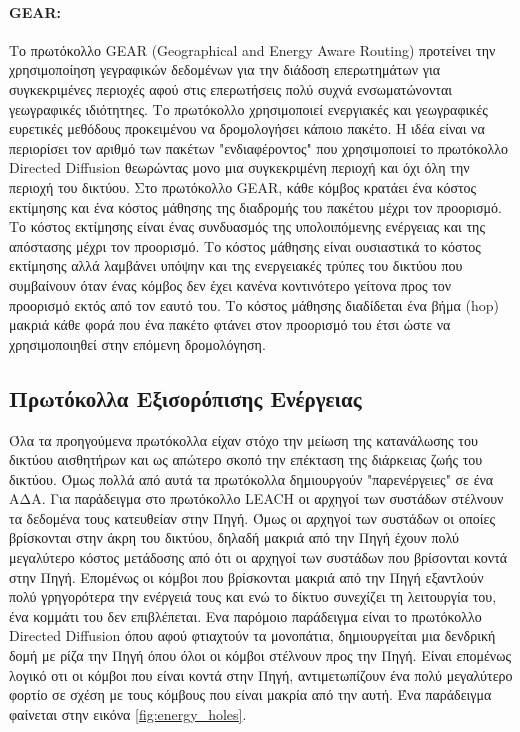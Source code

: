 \paragraph{GEAR:} Το πρωτόκολλο GEAR (Geographical and Energy Aware Routing) \cite{gear_protocol} προτείνει την χρησιμοποίηση γεγραφικών δεδομένων για την διάδοση
επερωτημάτων για συγκεκριμένες περιοχές αφού στις επερωτήσεις πολύ συχνά ενσωματώνονται γεωγραφικές ιδιότητηες. Το πρωτόκολλο χρησιμοποιεί ενεργιακές και γεωγραφικές
ευρετικές μεθόδους προκειμένου να δρομολογήσει κάποιο πακέτο. Η ιδέα είναι να περιορίσει τον αριθμό των πακέτων "ενδιαφέροντος" που χρησιμοποιεί το πρωτόκολλο
Directed Diffusion \cite{directed_diffusion} θεωρώντας μονο μια συγκεκριμένη περιοχή και όχι όλη την περιοχή του δικτύου. Στο πρωτόκολλο GEAR, κάθε κόμβος κρατάει
ένα κόστος εκτίμησης και ένα κόστος μάθησης της διαδρομής του πακέτου μέχρι τον προορισμό. Το κόστος εκτίμησης είναι ένας συνδυασμός της υπολοιπόμενης ενέργειας και
της απόστασης μέχρι τον προορισμό. Το κόστος μάθησης είναι ουσιαστικά το κόστος εκτίμησης αλλά λαμβάνει υπόψην και της ενεργειακές τρύπες του δικτύου που συμβαίνουν
όταν ένας κόμβος δεν έχει κανένα κοντινότερο γείτονα προς τον προορισμό εκτός από τον εαυτό του. Το κόστος μάθησης διαδίδεται ένα βήμα (hop) μακριά κάθε φορά που ένα
πακέτο φτάνει στον προορισμό του έτσι ώστε να χρησιμοποιηθεί στην επόμενη δρομολόγηση.




\subsection{Πρωτόκολλα Εξισορόπισης Ενέργειας}
Όλα τα προηγούμενα πρωτόκολλα είχαν στόχο την μείωση της κατανάλωσης του δικτύου αισθητήρων και ως απώτερο σκοπό την επέκταση της διάρκειας ζωής του δικτύου.
Όμως πολλά από αυτά τα πρωτόκολλα δημιουργούν "παρενέργειες" σε ένα ΑΔΑ.
Για παράδειγμα στο πρωτόκολλο LEACH \cite{leach_protocol} οι αρχηγοί των συστάδων στέλνουν τα δεδομένα τους κατευθείαν στην Πηγή. Όμως οι αρχηγοί των συστάδων οι
οποίες βρίσκονται στην άκρη του δικτύου, δηλαδή μακριά από την Πηγή έχουν πολύ μεγαλύτερο κόστος μετάδοσης από ότι οι αρχηγοί των συστάδων που βρίσονται κοντά στην
Πηγή.
Επομένως οι κόμβοι που βρίσκονται μακριά από την Πηγή εξαντλούν πολύ γρηγορότερα την ενέργειά τους και ενώ το δίκτυο συνεχίζει τη λειτουργία του, ένα κομμάτι
του δεν επιβλέπεται.
Ενα παρόμοιο παράδειγμα είναι το πρωτόκολλο Directed Diffusion \cite{directed_diffusion} όπου αφού φτιαχτούν τα μονοπάτια, δημιουργείται μια δενδρική δομή με ρίζα την
Πηγή όπου όλοι οι κόμβοι στέλνουν προς την Πηγή.
Είναι επομένως λογικό οτι οι κόμβοι που είναι κοντά στην Πηγή, αντιμετωπίζουν ένα πολύ μεγαλύτερο φορτίο σε σχέση με τους κόμβους που είναι μακρία από την αυτή.
Ένα παράδειγμα φαίνεται στην εικόνα \ref{fig:energy_holes}.

